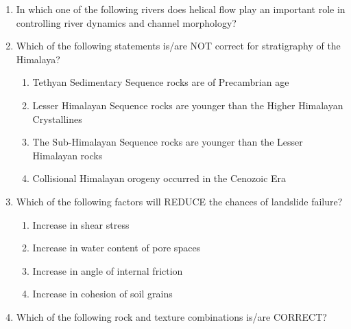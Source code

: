 \documentclass[journal,12pt,onecolumn]{IEEEtran}
\theoremstyle{remark}
\begin{document}
\begin{enumerate}
\item In which one of the following rivers does helical flow play an important role in controlling river dynamics and channel morphology? \hfill{}
\begin{enumerate}
\end{enumerate}

\item Which of the following statements is/are NOT correct for stratigraphy of the Himalaya? \hfill{}
\begin{enumerate}
    \item Tethyan Sedimentary Sequence rocks are of Precambrian age
    \item Lesser Himalayan Sequence rocks are younger than the Higher Himalayan Crystallines
    \item The Sub-Himalayan Sequence rocks are younger than the Lesser Himalayan rocks
    \item Collisional Himalayan orogeny occurred in the Cenozoic Era
\end{enumerate}

\item Which of the following factors will REDUCE the chances of landslide failure? \hfill{}
\begin{enumerate}
    \item Increase in shear stress
    \item Increase in water content of pore spaces
    \item Increase in angle of internal friction
    \item Increase in cohesion of soil grains
\end{enumerate}

\item Which of the following rock and texture combinations is/are CORRECT? \hfill{}
\begin{enumerate}
\end{enumerate}


\end{enumerate}
\end{document}
